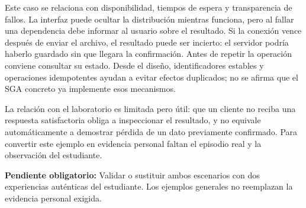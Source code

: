 \documentclass[11pt,a4paper]{article}
\newcommand{\pendiente}[1]{\par\textbf{Pendiente obligatorio:} #1\par}
\begin{document}
Este caso se relaciona con disponibilidad, tiempos de espera y transparencia de fallos. La interfaz puede ocultar la distribución mientras funciona, pero al fallar una dependencia debe informar al usuario sobre el resultado. Si la conexión vence después de enviar el archivo, el resultado puede ser incierto: el servidor podría haberlo guardado sin que llegara la confirmación. Antes de repetir la operación conviene consultar su estado. Desde el diseño, identificadores estables y operaciones idempotentes ayudan a evitar efectos duplicados; no se afirma que el SGA concreto ya implemente esos mecanismos.

La relación con el laboratorio es limitada pero útil: que un cliente no reciba una respuesta satisfactoria obliga a inspeccionar el resultado, y no equivale automáticamente a demostrar pérdida de un dato previamente confirmado. Para convertir este ejemplo en evidencia personal faltan el episodio real y la observación del estudiante.
\pendiente{Validar o sustituir ambos escenarios con dos experiencias auténticas del estudiante. Los ejemplos generales no reemplazan la evidencia personal exigida.}
\end{document}
